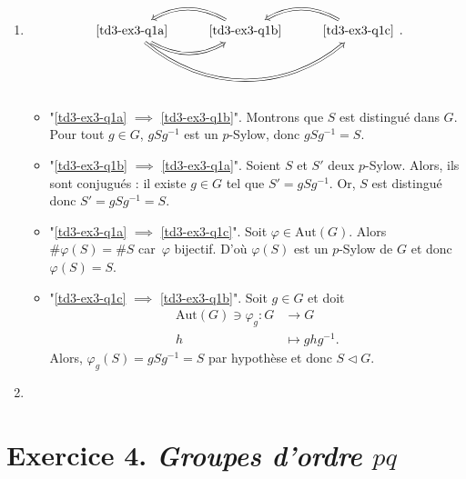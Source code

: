 \documentclass[./main]{subfiles}
\begin{document}
  \begin{enumerate}
    \item 
      \[
      \begin{tikzcd}
        \text{\ref{td3-ex3-q1a}} \arrow[Rightarrow,bend right]{r}{} \arrow[Rightarrow, bend right=40]{rr}{} & \arrow[Rightarrow, bend right]{l} \text{\ref{td3-ex3-q1b}} & \text{\ref{td3-ex3-q1c}} \arrow[Rightarrow, bend right]{l}{}
      \end{tikzcd}
      .\] 
      \begin{itemize}
        \item "\ref{td3-ex3-q1a} $\implies$ \ref{td3-ex3-q1b}".
          Montrons que $S$ est distingué dans $G$.
          Pour tout $g \in G$, $g S g^{-1}$ est un $p$-Sylow, donc $g S g^{-1} = S$.
        \item "\ref{td3-ex3-q1b} $\implies$ \ref{td3-ex3-q1a}".
          Soient $S$ et $S'$ deux $p$-Sylow. Alors, ils sont conjugués : il existe $g \in G$ tel que $S' = g S g^{-1}$.
          Or, $S$ est distingué donc $S' = g S g^{-1} = S$.
        \item "\ref{td3-ex3-q1a} $\implies$ \ref{td3-ex3-q1c}".
          Soit $\varphi \in \mathrm{Aut}(G)$.
          Alors $\# \varphi(S) = \# S$ car~$\varphi$ bijectif.
          D'où $\varphi(S)$ est un  $p$-Sylow de $G$ et donc $\varphi(S) = S$.
        \item "\ref{td3-ex3-q1c} $\implies$ \ref{td3-ex3-q1b}".
          Soit $g \in G$ et doit \begin{align*}
            \mathrm{Aut}(G) \ni \varphi_g: G &\longrightarrow G \\
            h &\longmapsto ghg^{-1}
          .\end{align*}
          Alors, $\varphi_g(S) = g S g^{-1} = S$ par hypothèse et donc $S \triangleleft G$.
      \end{itemize}
    \item 
  \end{enumerate}

  \section{Exercice 4. \textit{Groupes d'ordre $pq$}}
\end{document}
